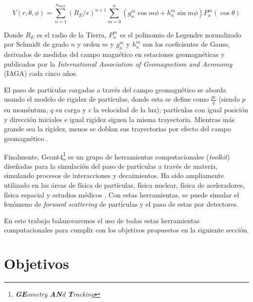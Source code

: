\documentclass[12pt]{report}
\begin{document}
\begin{equation}
V(r, \theta, \phi)=\sum_{n=1}^{n_{max}}\left(R_{E} / r\right)^{n+1} \sum_{m=0}^{n}\left(g_{n}^{m} \cos m \phi+h_{n}^{m} \sin m \phi\right) P_{n}^{m}(\cos \theta)
\end{equation}

Donde $R_E$ es el radio de la Tierra, $P_n^m$ es el polinomio de Legendre normalizado por Schmidt de grado $n$ y orden $m$ y $g_n^m$ y $h_n^m$ son los coeficientes de Gauss, derivados de medidas del campo magnético en estaciones geomagnéticas y publicados por la \textit{International Association of Geomagnetism and Aeronomy} (IAGA) cada cinco años.

El paso de partículas cargadas a través del campo geomagnético se aborda usando el modelo de rigidez de partículas, donde esta se define como $\frac{pc}{q}$ (siendo $p$ su moméntum, $q$ su carga y $c$ la velocidad de la luz); partículas con igual posición y dirección iniciales e igual rigidez siguen la misma trayectoria. Mientras más grande sea la rigidez, menos se doblan sus trayectorias por efecto del campo geomagnético \cite{magnetocosmics}.

Finalmente, Geant4\footnote{\textit{\textbf{GE}ometry \textbf{AN}d \textbf{T}racking}} es un grupo de herramientas computacionales (\textit{toolkit}) diseñadas para la simulación del paso de partículas a través de materia, simulando procesos de interacciones y decaimientos. Ha sido ampliamente utilizado en las áreas de física de partículas, física nuclear, física de aceleradores, física espacial y estudios médicos \cite{agostinelli2003geant4}. Con estas herramientas, se puede simular el fenómeno de \textit{forward scattering} de partículas y el paso de estas por detectores.

En este trabajo balancearemos el uso de todas estas herramientas computacionales para cumplir con los objetivos propuestos en la siguiente sección.














\section*{Objetivos}
\end{document}
